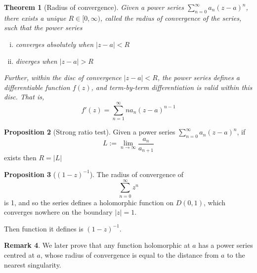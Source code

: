 \documentclass[10pt,fleqn]{article}
\theoremstyle{definition} \newtheorem{defn}{Definition}[section]
\theoremstyle{plain}      \newtheorem{thm}[defn]{Theorem}
\theoremstyle{definition} \newtheorem{prop}[defn]{Proposition}
\theoremstyle{plain}      \newtheorem{lem}[defn]{Lemma}
\theoremstyle{definition} \newtheorem{cor}[defn]{Corollary}
\theoremstyle{definition} \newtheorem{ex}[defn]{Example}
\theoremstyle{definition} \newtheorem{rem}[defn]{Remark}
\begin{document}
\begin{thm}[Radius of convergence]
    Given a power series $\sum_{n=0}^{\infty}a_n(z-a)^n$, there exists a unique $R\in[0,\infty)$, called the \emph{radius of convergence} of the series, such that the power series
    \begin{enumerate}[(i)]
        \item converges absolutely when $|z-a|<R$
        \item diverges when $|z-a|>R$
    \end{enumerate}

    Further, within the \emph{disc of convergence} $|z-a|<R$, the power series defines a differentiable function $f(z)$, and term-by-term differentiation is valid within this disc.
    That is,
    \begin{equation}
        f'(z)=
        \sum_{n=1}^{\infty}na_n(z-a)^{n-1}
    \end{equation}
\end{thm}

\begin{prop}[Strong ratio test]
    Given a power series $\sum_{n=0}^{\infty}a_n(z-a)^n$, if
    \begin{equation}
        L:=
        \lim_{n\to\infty}\frac{a_n}{a_{n+1}}
    \end{equation}
    exists then $R=|L|$
\end{prop}

\begin{prop}[$(1-z)^{-1}$]
    The radius of convergence of
    \begin{equation}
        \sum_{n=0}^{\infty}z^n
    \end{equation}
    is 1, and so the series defines a holomorphic function on $D(0,1)$, which converges nowhere on the boundary $|z|=1$.

    Then function it defines is $(1-z)^{-1}$.
\end{prop}

\begin{rem}
    We later prove that any function holomorphic at $a$ has a power series centred at $a$, whose radius of convergence is equal to the distance from $a$ to the nearest singularity.
\end{rem}
\end{document}

